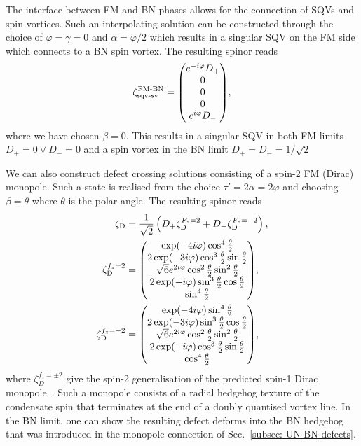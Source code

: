 The interface between FM and BN phases allows for the connection of SQVs and
spin vortices.
Such an interpolating solution can be constructed through the
choice of \(\varphi=\gamma=0\) and \(\alpha=\varphi/2\) which results in a
singular SQV on the FM side which connects to a BN spin vortex.
The resulting spinor reads
\begin{equation}
    \zeta^\text{FM-BN}_\text{sqv-sv} =
    \mqty(e^{-i\varphi}D_+ \\ 0 \\ 0 \\ 0 \\
    e^{i\varphi}D_-),
\end{equation}
where we have chosen \(\beta = 0\).
This results in a singular SQV in both FM limits \(D_+ = 0 \vee D_- = 0\) and
a spin vortex in the BN limit \(D_+ = D_- = 1/\sqrt{2}\)

We can also construct defect crossing solutions consisting of a spin-2 FM
(Dirac) monopole.
Such a state is realised from the choice \(\tau'=2\alpha=2\varphi \) and
choosing \(\beta = \theta \) where \(\theta \) is the polar angle.
The resulting spinor reads
\begin{align}\label{eq: C-FM-Dirac}
    \zeta_\text{D}          & = \frac{1}{\sqrt{2}}
    \left( D_+\zeta^{F_z=2}_\text{D}+ D_-\zeta^{F_z=-2}_\text{D}\right), \\
    \zeta^{f_z=2}_\text{D}  & =
    \mqty(
    \exp(-4i\varphi) \cos^4 \frac{\theta}{2}                             \\
    2\exp(-3i\varphi) \cos^3 \frac{\theta}{2} \sin \frac{\theta}{2}      \\
    \sqrt{6}e^{2i\varphi}\cos^2\frac{\theta}{2}\sin^2\frac{\theta}{2}    \\
    2\exp(-i\varphi) \sin^3 \frac{\theta}{2} \cos \frac{\theta}{2}       \\
    \sin^4\frac{\theta}{2}
    \label{eq: C-BN-dirac2}
    ),                                                                   \\
    \zeta^{f_z=-2}_\text{D} & =
    \mqty(
    \exp(-4i\varphi) \sin^4 \frac{\theta}{2}                             \\
    2\exp(-3i\varphi) \sin^3 \frac{\theta}{2} \cos \frac{\theta}{2}      \\
    \sqrt{6}e^{2i\varphi}\cos^2\frac{\theta}{2}\sin^2\frac{\theta}{2}    \\
    2\exp(-i\varphi) \cos^3 \frac{\theta}{2} \sin \frac{\theta}{2}       \\
    \cos^4\frac{\theta}{2}
    \label{eq: C-BN-dirac-2}
    ),
\end{align}
where \(\zeta_D^{f_z = \pm 2}\) give the spin-2 generalisation of the
predicted spin-1 Dirac monopole~\cite{Savage2003}.
Such a monopole consists of a radial hedgehog texture of the condensate spin
that terminates at the end of a doubly quantised vortex line.
In the BN limit, one can show the resulting defect deforms into the BN hedgehog
that was introduced in the monopole connection of
Sec.~\ref{subsec: UN-BN-defects}.

